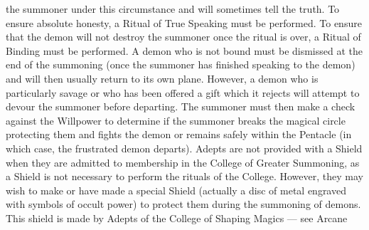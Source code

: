 \documentclass[a4paper]{article}
\begin{document}
\begin{multicols}{3}
the summoner under this circumstance and will
sometimes tell the truth. To ensure absolute honesty, a Ritual of True Speaking must be performed.
To ensure that the demon will not destroy the
summoner once the ritual is over, a Ritual of Binding must be performed. A demon who is not bound
must be dismissed at the end of the summoning
(once the summoner has finished speaking to the
demon) and will then usually return to its own
plane. However, a demon who is particularly savage or who has been offered a gift which it rejects
will attempt to devour the summoner before departing. The summoner must then make a check
against the Willpower to determine if the summoner breaks the magical circle protecting them
and fights the demon or remains safely within the
Pentacle (in which case, the frustrated demon
departs).
Adepts are not provided with a Shield when they
are admitted to membership in the College of
Greater Summoning, as a Shield is not necessary to
perform the rituals of the College. However, they
may wish to make or have made a special Shield
(actually a disc of metal engraved with symbols of
occult power) to protect them during the summoning of demons. This shield is made by Adepts of
the College of Shaping Magics — see Arcane


\end{multicols}
\end{document}

